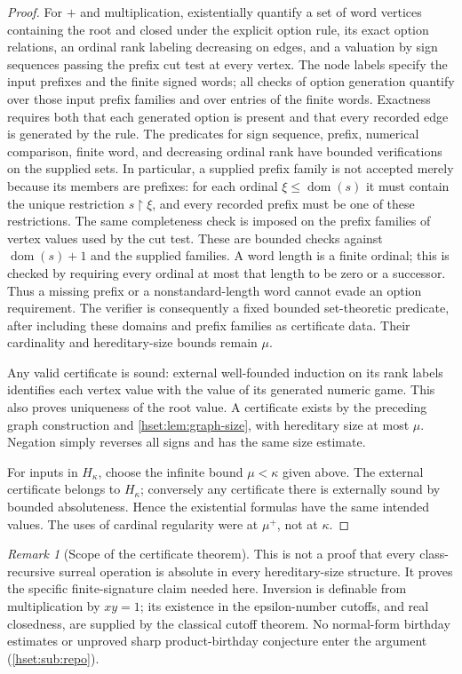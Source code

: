 \documentclass[11pt,letterpaper]{article}
\theoremstyle{definition}
\theoremstyle{remark}
\newtheorem{remark}[remark]{Remark}\aliascntresetthe{remark}
\newcommand{\dom}{\operatorname{dom}}
\begin{document}
\begin{proof}
For $+$ and multiplication, existentially quantify a set of word vertices
containing the root and closed under the explicit option rule, its exact
option relations, an ordinal rank labeling decreasing on edges, and a
valuation by sign sequences passing the prefix cut test at every vertex.
The node labels specify the input prefixes and the finite signed words; all
checks of option generation quantify over those input prefix families and
over entries of the finite words. Exactness requires both that each generated
option is present and that every recorded edge is generated by the rule.
The predicates for sign sequence, prefix, numerical comparison, finite word,
and decreasing ordinal rank have bounded verifications on the supplied
sets. In particular, a supplied prefix family is not accepted merely because
its members are prefixes: for each ordinal $\xi\le\dom(s)$ it must contain
the unique restriction $s\mathbin{\upharpoonright}\xi$, and every recorded
prefix must be one of these restrictions. The same completeness check is
imposed on the prefix families of vertex values used by the cut test.
These are bounded checks against $\dom(s)+1$ and the supplied families.
A word length is a finite ordinal; this is checked by requiring every
ordinal at most that length to be zero or a successor. Thus a missing
prefix or a nonstandard-length word cannot evade an option requirement.
The verifier is consequently a fixed bounded set-theoretic predicate,
after including these domains and prefix families as certificate data.
Their cardinality and hereditary-size bounds remain $\mu$.

Any valid certificate is sound: external well-founded induction on its
rank labels identifies each vertex value with the value of its generated
numeric game. This also proves uniqueness of the root value. A certificate
exists by the preceding graph construction and \cref{hset:lem:graph-size},
with hereditary size at most $\mu$. Negation simply reverses all signs and has
the same size estimate.

For inputs in $H_\kappa$, choose the infinite bound $\mu<\kappa$ given above.
The external certificate belongs to $H_\kappa$; conversely any certificate
there is externally sound by bounded absoluteness. Hence the existential
formulas have the same intended values. The uses of cardinal regularity were
at $\mu^+$, not at $\kappa$.
\end{proof}

\begin{remark}[Scope of the certificate theorem]
This is not a proof that every class-recursive surreal operation is absolute
in every hereditary-size structure. It proves the specific finite-signature
claim needed here. Inversion is definable from multiplication by $xy=1$;
its existence in the epsilon-number cutoffs, and real closedness, are supplied
by the classical cutoff theorem. No normal-form birthday estimates or
unproved sharp product-birthday conjecture enter the argument
(\cref{hset:sub:repo}).
\end{remark}
\end{document}
